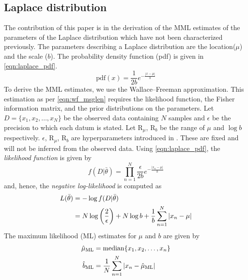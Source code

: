 \documentclass[wcp]{jmlr}
\begin{document}
\subsection{Laplace distribution}
The contribution of this paper is in the derivation of the MML estimates of 
the parameters of the Laplace distribution which have not been characterized previously.
The parameters describing a Laplace distribution are the location($\mu$) and the scale ($b$).
The probability density function (pdf) is given in \eqref{eqn:laplace_pdf}.
\begin{equation}
\mathrm{pdf}(x) = \frac{1}{2b}e^{-\frac{|x-\mu|}{b}} \label{eqn:laplace_pdf}
\end{equation}
To derive the MML estimates, we use the Wallace--Freeman approximation. 
This estimation as per \eqref{eqn:wf_msglen} requires the likelihood function, the Fisher information matrix,
and the prior distributions on the parameters. Let $D = \{x_1,x_2,\ldots,x_N\}$ be the observed data 
containing $N$ samples and $\epsilon$ be the precision to which each datum is stated. 
Let $\mathrm{R}_{\mu}$, $\mathrm{R}_{b}$ be the range of $\mu$ and $\log b$ 
respectively. $\epsilon$, $\mathrm{R}_{\mu}$, $\mathrm{R}_{b}$ are hyperparameters
introduced in \citet{WallaceBook}. These are fixed and will
not be inferred from the observed data. 
Using \autoref{eqn:laplace_pdf}, the \emph{likelihood function} is given by
\[ f(D|\bar{\theta}) = \prod_{n=1}^N \frac{\epsilon}{2b} e^{-\frac{|x_n-\mu|}{b}} \]
and, hence, the \emph{negative log-likelihood} is computed as
\begin{align}
 L(\bar{\theta}) &= -\log f(D|\bar{\theta}) \notag\\
		 &= N\log\left(\frac{2}{\epsilon}\right) + N\log b + \frac{1}{b}\sum_{n=1}^N |x_n-\mu| \label{eqn:laplace_l}
\end{align}
The maximum likelihood (ML) estimates for $\mu$ and $b$ are given by
\begin{align}
\hat{\mu}_{\mathrm{ML}} &= \mathrm{median}\{x_1,x_2,\ldots,x_n\} \notag\\ 
\hat{b}_{\mathrm{ML}} &= \frac{1}{N} \sum_{n=1}^N |x_n-\hat{\mu}_{\mathrm{ML}}| \label{eqn:ml_estimate}
\end{align}
\end{document}
